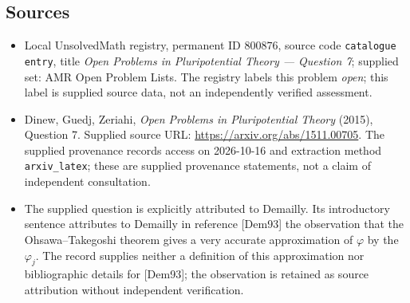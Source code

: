 \documentclass[11pt]{article}
\begin{document}
\subsection{Sources}
\begin{itemize}
\item Local UnsolvedMath registry, permanent ID \(800876\), source code \texttt{catalogue entry}, title \emph{Open Problems in Pluripotential Theory --- Question 7}; supplied set: AMR Open Problem Lists. The registry labels this problem \emph{open}; this label is supplied source data, not an independently verified assessment.
\item Dinew, Guedj, Zeriahi, \emph{Open Problems in Pluripotential Theory} (2015), Question 7. Supplied source URL: \url{https://arxiv.org/abs/1511.00705}. The supplied provenance records access on 2026-10-16 and extraction method \texttt{arxiv\_latex}; these are supplied provenance statements, not a claim of independent consultation.
\item The supplied question is explicitly attributed to Demailly. Its introductory sentence attributes to Demailly in reference [Dem93] the observation that the Ohsawa--Takegoshi theorem gives a very accurate approximation of \(\varphi\) by the \(\varphi_j\). The record supplies neither a definition of this approximation nor bibliographic details for [Dem93]; the observation is retained as source attribution without independent verification.
\end{itemize}
\end{document}
